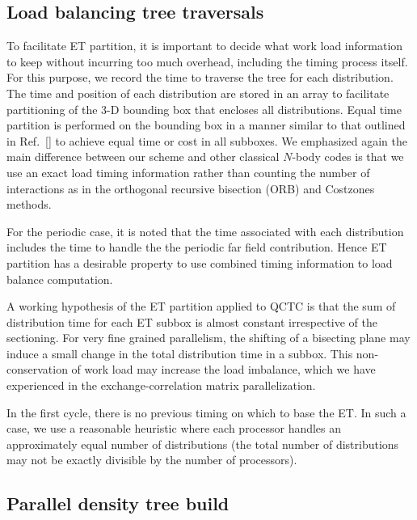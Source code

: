\commentoutA{\documentclass[prl,aps,twocolumn,twocolumngrid,superbib]{revtex4}}
\begin{document}
\subsection{Load balancing tree traversals}
\label{ETPartition}
To facilitate ET partition, it is important to decide what work load
information to keep without incurring too much overhead, including the
timing process itself.  For this purpose, we record the time to
traverse the tree for each distribution. The time and position of each
distribution are stored in an array to facilitate partitioning of the
3-D bounding box that encloses all distributions. Equal time partition
is performed on the bounding box in a manner similar to that outlined
in Ref.~[] to achieve equal time or cost in all
subboxes.  We emphasized again the main difference between our scheme
and other classical $N$-body codes\cite{MWarren92,Singh93} is that we
use an exact load timing information rather than counting the number
of interactions as in the orthogonal recursive bisection
(ORB)\cite{MWarren92} and Costzones methods\cite{Singh93}.

For the periodic case, it is noted that the time associated with each
distribution includes the time to handle the the periodic far field
contribution. Hence ET partition has a desirable property to use
combined timing information to load balance computation.


A working hypothesis of the ET partition applied to QCTC is that the
sum of distribution time for each ET subbox is almost constant
irrespective of the sectioning. For very fine grained parallelism, the
shifting of a bisecting plane may induce a small change in the total
distribution time in a subbox.  This non-conservation of work load may
increase the load imbalance, which we have experienced in the
exchange-correlation matrix parallelization\cite{CGan03}.

In the first cycle, there is no previous timing on which to base the
ET. In such a case, we use a reasonable heuristic where each processor
handles an approximately equal number of distributions (the total
number of distributions may not be exactly divisible by the number of
processors).

\subsection{Parallel density tree build} 
\label{sec:parallelTB}
\end{document}
